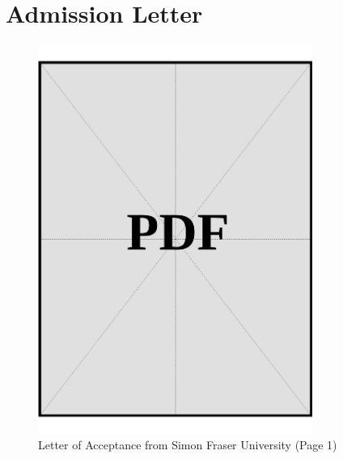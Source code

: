 
\chapter{Admission Letter}\label{sec:admission-letter}

\begin{figure}[H]
    \centering
    \includegraphics[page=1, width=0.8\textwidth]{../docs/applicant/canadian-institution/letter-of-acceptance.pdf}
    \caption{Letter of Acceptance from Simon Fraser University (Page 1)}
    \label{fig:letter-of-acceptance}
\end{figure}

\clearpage
